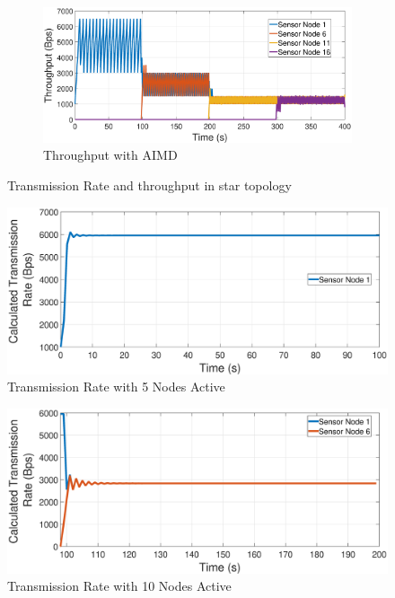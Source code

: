 \begin{figure}
\begin{subfigure}[b]{0.475\textwidth}
	\end{subfigure}
	\quad
	\begin{subfigure}[b]{0.475\textwidth}   
		\centering 
		\includegraphics[width=\textwidth, height=0.2\textheight]{pics/AIMDtru}
		\caption{Throughput with AIMD}
		\label{fig:aimdtru}
	\end{subfigure}
	\caption{Transmission Rate and throughput in star topology}  
	\label{fig:gambar}
\end{figure}

\begin{figure}
	\centering
	\includegraphics[width=1\linewidth]{pics/Lotka1}
	\caption{Transmission Rate with 5 Nodes Active}
	\label{fig:lotka1}
\end{figure}

\begin{figure}
	\centering
	\includegraphics[width=1\linewidth]{pics/Lotka2}
	\caption{Transmission Rate with 10 Nodes Active}
	\label{fig:lotka2}
\end{figure}

